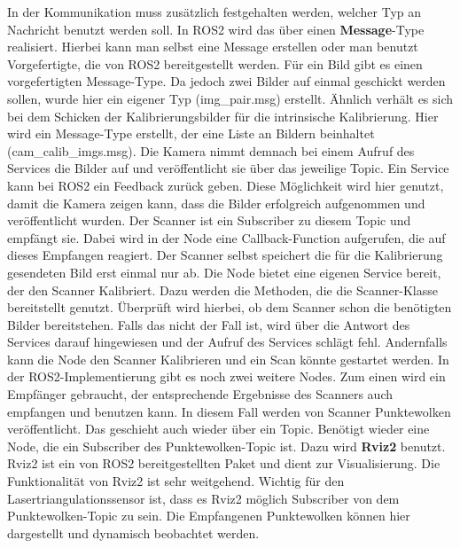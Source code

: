 		In der Kommunikation muss zusätzlich festgehalten werden, welcher Typ an Nachricht benutzt werden soll. In ROS2 wird das über einen \textbf{Message}-Type realisiert. Hierbei kann man selbst eine Message erstellen oder man benutzt Vorgefertigte, die von ROS2 bereitgestellt werden. Für ein Bild gibt es einen vorgefertigten Message-Type. Da jedoch zwei Bilder auf einmal geschickt werden sollen, wurde hier ein eigener Typ (img\_pair.msg) erstellt. Ähnlich verhält es sich bei dem Schicken der Kalibrierungsbilder für die intrinsische Kalibrierung. Hier wird ein Message-Type erstellt, der eine Liste an Bildern beinhaltet (cam\_calib\_imgs.msg). Die Kamera nimmt demnach bei einem Aufruf des Services die Bilder auf und veröffentlicht sie über das jeweilige Topic. Ein Service kann bei ROS2 ein Feedback zurück geben. Diese Möglichkeit wird hier genutzt, damit die Kamera zeigen kann, dass die Bilder erfolgreich aufgenommen und veröffentlicht wurden. Der Scanner ist ein Subscriber zu diesem Topic und empfängt sie. Dabei wird in der Node eine Callback-Function aufgerufen, die auf dieses Empfangen reagiert. Der Scanner selbst speichert die für die Kalibrierung gesendeten Bild erst einmal nur ab. \newline
		Die Node bietet eine eigenen Service bereit, der den Scanner Kalibriert. Dazu werden die Methoden, die die Scanner-Klasse bereitstellt genutzt. Überprüft wird hierbei, ob dem Scanner schon die benötigten Bilder bereitstehen. Falls das nicht der Fall ist, wird über die Antwort des Services darauf hingewiesen und der Aufruf des Services schlägt fehl. Andernfalls kann die Node den Scanner Kalibrieren und ein Scan könnte gestartet werden. \newline
		In der ROS2-Implementierung gibt es noch zwei weitere Nodes. Zum einen wird ein Empfänger gebraucht, der entsprechende Ergebnisse des Scanners auch empfangen und benutzen kann. In diesem Fall werden von Scanner Punktewolken veröffentlicht. Das geschieht auch wieder über ein Topic. Benötigt wieder eine Node, die ein Subscriber des Punktewolken-Topic ist. Dazu wird \textbf{Rviz2} benutzt. Rviz2 ist ein von ROS2 bereitgestellten Paket und dient zur Visualisierung. Die Funktionalität von Rviz2 ist sehr weitgehend. Wichtig für den Lasertriangulationssensor ist, dass es Rviz2 möglich Subscriber von dem Punktewolken-Topic zu sein. Die Empfangenen Punktewolken können hier dargestellt und dynamisch beobachtet werden. \newline
